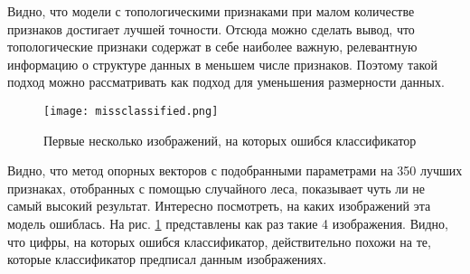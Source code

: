 Видно, что модели с топологическими признаками при малом количестве признаков достигает лучшей точности. Отсюда можно сделать вывод, что топологические признаки содержат в себе наиболее важную, релевантную информацию о структуре данных в меньшем числе признаков. Поэтому такой подход можно рассматривать как подход для уменьшения размерности данных. 

\begin{figure}[!htbp]
	\begin{center}
		\texttt{[image: missclassified.png]}\\
		\caption{Первые несколько изображений, на которых ошибся классификатор}
		\label{missclassified}
	\end{center}
\end{figure}

Видно, что метод опорных векторов с подобранными параметрами на 350 лучших признаках, отобранных с помощью случайного леса, показывает чуть ли не самый высокий результат. Интересно посмотреть, на каких изображений эта модель ошиблась. На рис. \ref{missclassified} представлены как раз такие 4 изображения. Видно, что цифры, на которых ошибся классификатор, действительно похожи на те, которые классификатор предписал данным изображениях.
